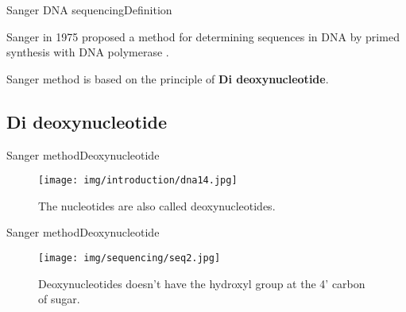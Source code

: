 \documentclass[10pt]{beamer}
\newcommand{\1}{
	\setbeamertemplate{background}{
		\texttt{[image: img/1]}
		\tikz[overlay] \fill[fill opacity=0.75,fill=white] (0,0) rectangle (-\paperwidth,\paperheight);
	}
}
\begin{document}
\begin{frame}{Sanger DNA sequencing}{Definition}
	
	\begin{block}{}
		Sanger in 1975 proposed a method for determining sequences in DNA by primed synthesis with DNA polymerase \cite{sanger1996rapid}.
	\end{block}
	
	\begin{block}{}
		Sanger method is based on the principle of \textbf{Di deoxynucleotide}.
	\end{block}
	
\end{frame}

\subsection{Di deoxynucleotide}


\begin{frame}{Sanger method}{Deoxynucleotide}
	\begin{figure}[]
		\centering
		\texttt{[image: img/introduction/dna14.jpg]}
		\label{img:mot2}
		\caption{The nucleotides are also called deoxynucleotides.}
	\end{figure}
\end{frame}

\begin{frame}{Sanger method}{Deoxynucleotide}
	\begin{figure}[]
		\centering
		\texttt{[image: img/sequencing/seq2.jpg]}
		\label{img:mot2}
		\caption{Deoxynucleotides doesn't have the hydroxyl group at the 4' carbon of sugar.}
	\end{figure}
\end{frame}
\end{document}
